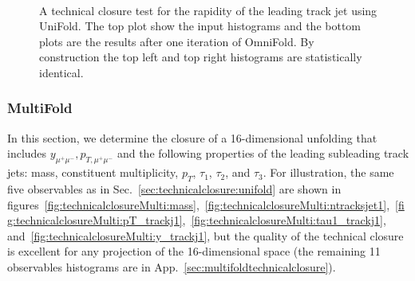 \begin{figure}[h!]
\centering
{}\\
\caption{A technical closure test for the rapidity of the leading track jet using UniFold.  The top plot show the input histograms and the bottom plots are the results after one iteration of OmniFold.  By construction the top left and top right histograms are statistically identical.}
\label{fig:technicalclosure:y_trackj1}
\end{figure}

\subsubsection{MultiFold}
\label{sec:technicalclosure:multifold}

In this section, we determine the closure of a 16-dimensional unfolding that includes $y_{\mu^+\mu^-},p_{T,\mu^+\mu^-}$ and the following properties of the leading subleading track jets: mass, constituent multiplicity, $p_T$, $\tau_1$, $\tau_2$, and $\tau_3$.  For illustration, the same five observables as in Sec.~\ref{sec:technicalclosure:unifold} are shown in figures~\ref{fig:technicalclosureMulti:mass},~\ref{fig:technicalclosureMulti:ntracksjet1},~\ref{fig:technicalclosureMulti:pT_trackj1},~\ref{fig:technicalclosureMulti:tau1_trackj1}, and~\ref{fig:technicalclosureMulti:y_trackj1}, but the quality of the technical closure is excellent for any projection of the 16-dimensional space (the remaining 11 observables histograms are in App.~\ref{sec:multifoldtechnicalclosure}).

